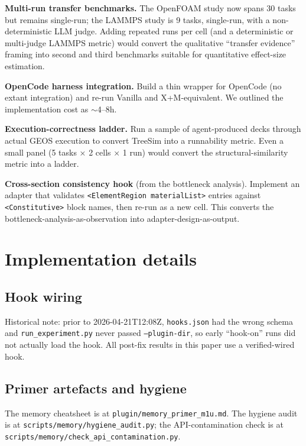 \documentclass{article}
\begin{document}
\textbf{Multi-run transfer benchmarks.} The OpenFOAM study now spans 30 tasks but remains single-run; the LAMMPS study is 9 tasks, single-run, with a non-deterministic LLM judge. Adding repeated runs per cell (and a deterministic or multi-judge LAMMPS metric) would convert the qualitative ``transfer evidence'' framing into second and third benchmarks suitable for quantitative effect-size estimation.

\textbf{OpenCode harness integration.} Build a thin wrapper for OpenCode (no extant integration) and re-run Vanilla and X+M-equivalent. We outlined the implementation cost as $\sim$4--8h.

\textbf{Execution-correctness ladder.} Run a sample of agent-produced decks through actual GEOS execution to convert TreeSim into a runnability metric. Even a small panel (5 tasks × 2 cells × 1 run) would convert the structural-similarity metric into a ladder.

\textbf{Cross-section consistency hook} (from the bottleneck analysis). Implement an adapter that validates \texttt{<ElementRegion materialList>} entries against \texttt{<Constitutive>} block names, then re-run as a new cell. This converts the bottleneck-analysis-as-observation into adapter-design-as-output.
\fi %

\section{Implementation details}
\label{app:impl}

\subsection{Hook wiring}
Historical note: prior to 2026-04-21T12:08Z, \texttt{hooks.json} had the wrong schema and \texttt{run\_experiment.py} never passed \texttt{--plugin-dir}, so early ``hook-on'' runs did not actually load the hook. All post-fix results in this paper use a verified-wired hook.

\subsection{Primer artefacts and hygiene}
The memory cheatsheet is at \texttt{plugin/memory\_primer\_m1u.md}. The hygiene audit is at \texttt{scripts/memory/hygiene\_audit.py}; the API-contamination check is at \texttt{scripts/memory/check\_api\_contamination.py}.
\end{document}
